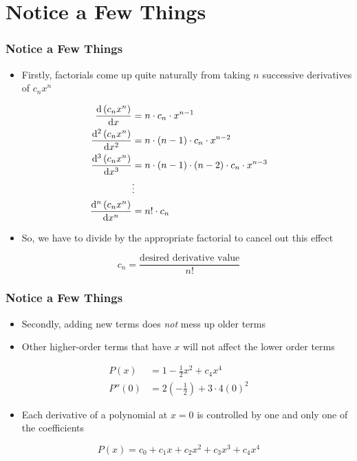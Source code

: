 \documentclass{beamer}
\begin{document}
\section{Notice a Few Things}

\begin{frame}
  \frametitle{Notice a Few Things}
  \begin{itemize}
    \item Firstly, factorials come up quite naturally from taking \( n \) successive derivatives of \( c_nx^n \)
  \end{itemize}
  \begin{align*}
    \dv{\left(c_nx^n\right)}{x} &= n \cdot c_n \cdot x^{n - 1} \\
    \dv[2]{\left(c_nx^n\right)}{x} &= n \cdot (n - 1) \cdot c_n \cdot x^{n - 2} \\
    \dv[3]{\left(c_nx^n\right)}{x} &= n \cdot (n - 1) \cdot (n - 2) \cdot c_n \cdot x^{n - 3} \\
    & \vdots \\
    \dv[n]{\left(c_nx^n\right)}{x} &= n! \cdot c_n
  \end{align*}
  \begin{itemize}
    \item So, we have to divide by the appropriate factorial to cancel out this effect
  \end{itemize}
  \begin{equation*}
    c_n = \frac{\text{desired derivative value}}{n!}
  \end{equation*}
\end{frame}

\begin{frame}
  \frametitle{Notice a Few Things}
  \begin{itemize}
    \item Secondly, adding new terms does \textit{not} mess up older terms
    \item Other higher-order terms that have \( x \) will not affect the lower order terms
  \end{itemize}
  \begin{align*}
    P(x) & = 1 - \frac{1}{2}x^2 + c_4 x^4 \\
    P''(0) & = 2\left(-\frac{1}{2}\right) + 3 \cdot 4 (0)^2
  \end{align*}
  \begin{itemize}
    \item Each derivative of a polynomial at \( x = 0 \) is controlled by one and only one of the coefficients
  \end{itemize}
  \begin{equation*}
    P(x) = c_0 + c_1x + c_2x^2 + c_3x^3 + c_4x^4
  \end{equation*} %
\end{frame}
\end{document}
